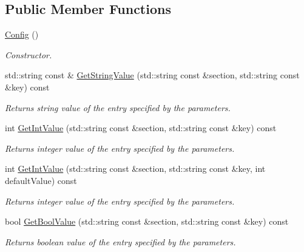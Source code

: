 \subsection*{Public Member Functions}
\begin{DoxyCompactItemize}
\item 
\hypertarget{class_common_1_1_config_ae5f62f67f9815ba0cb963ae78565e00d}{\hyperlink{class_common_1_1_config_ae5f62f67f9815ba0cb963ae78565e00d}{Config} ()}\label{class_common_1_1_config_ae5f62f67f9815ba0cb963ae78565e00d}

\begin{DoxyCompactList}\small\item\em Constructor. \end{DoxyCompactList}\item 
std\-::string const \& \hyperlink{class_common_1_1_config_ae4f60b0f7e86b4cf1887ec47afcdc485}{Get\-String\-Value} (std\-::string const \&section, std\-::string const \&key) const 
\begin{DoxyCompactList}\small\item\em Returns string value of the entry specified by the parameters. \end{DoxyCompactList}\item 
int \hyperlink{class_common_1_1_config_ac34ebeb553d7a1ab361346e7bb037140}{Get\-Int\-Value} (std\-::string const \&section, std\-::string const \&key) const 
\begin{DoxyCompactList}\small\item\em Returns integer value of the entry specified by the parameters. \end{DoxyCompactList}\item 
int \hyperlink{class_common_1_1_config_ae22508ea700d687afd24b2de16831afb}{Get\-Int\-Value} (std\-::string const \&section, std\-::string const \&key, int default\-Value) const 
\begin{DoxyCompactList}\small\item\em Returns integer value of the entry specified by the parameters. \end{DoxyCompactList}\item 
bool \hyperlink{class_common_1_1_config_ac5c1ff98fb84f80f3cca85fd17e494f3}{Get\-Bool\-Value} (std\-::string const \&section, std\-::string const \&key) const 
\begin{DoxyCompactList}\small\item\em Returns boolean value of the entry specified by the parameters. \end{DoxyCompactList}\item 

\end{DoxyCompactItemize}
